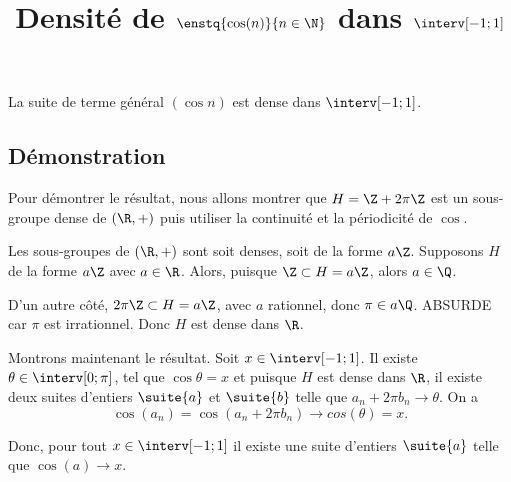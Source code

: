 \documentclass[fontsize=12pt,twoside=false,parskip=half, french]{scrartcl}
\title{Densité de $\enstq{\cos(n)}{n \in \N}$ dans $\interv[-1; 1]$}
\date{}
\author{}
\begin{document}
\maketitle
   \begin{Theoreme}
      La suite de terme général $(\cos n)$ est dense dans $\interv[-1; 1]$.
   \end{Theoreme}
   \subsection{Démonstration}
      Pour démontrer le résultat, nous allons montrer que $H = \Z + 2 \pi \Z$ est un sous-groupe dense 
      de $(\R, +)$ puis utiliser la continuité et la périodicité de $\cos$.
      
      Les sous-groupes de $(\R, +)$ sont soit denses, soit de la forme $a\Z$. Supposons $H$ de la forme $a\Z$ avec 
      $a \in \R$. Alors, puisque $\Z \subset H = a\Z$, alors $a \in \Q$. 
      
      D’un autre côté, $2\pi\Z \subset H = a\Z$, avec $a$ rationnel, donc $\pi \in a\Q$. ABSURDE car $\pi$ est irrationnel.
      Donc $H$ est dense dans $\R$.
      
      Montrons maintenant le résultat. Soit $x \in \interv[-1; 1]$. Il existe $\theta \in \interv[0; \pi]$, tel que 
      $\cos \theta = x$ et puisque $H$ est dense dans $\R$, il existe deux suites d’entiers $\suite{a}$ et $\suite{b}$
      telle que $a_n + 2\pi b_n \to \theta$.
      On a 
      \[
         \cos(a_n) = \cos(a_n + 2\pi b_n) \to cos(\theta) = x.
      \]
      
      Donc, pour tout $x \in \interv[-1; 1]$ il existe une suite d’entiers $\suite{a}$ telle que $\cos(a) \to x$.
\end{document}
